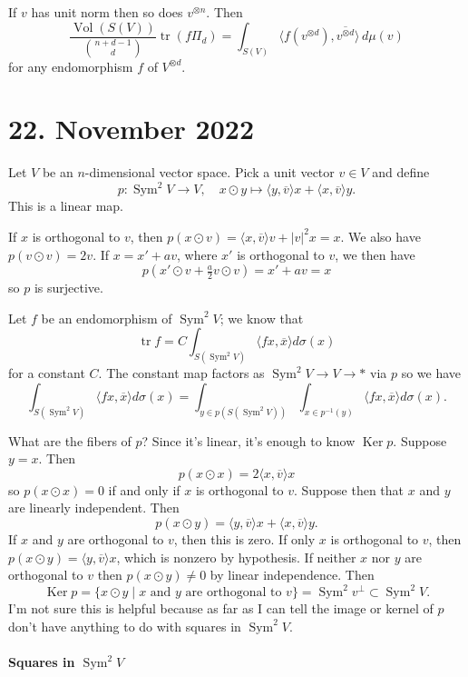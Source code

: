 \documentclass[11pt]{article}
\theoremstyle{definition}
\def\ov#1{\overline{#1}}
\DeclareMathOperator{\Vol}{Vol}
\DeclareMathOperator{\Ker}{Ker}
\DeclareMathOperator{\Sym}{Sym}
\DeclareMathOperator{\tr}{tr}
\begin{document}
If $v$ has unit norm then so does $v^{\otimes n}$.
Then
$$
\frac{\Vol(S(V))}{\binom{n+d-1}{d}} \tr(f \Pi_d)
= \int_{S(V)} \langle f(v^{\otimes d}), \ov{v^{\otimes d}} \rangle \, d\mu(v)
$$
for any endomorphism $f$ of $V^{\otimes d}$.


\section{22. November 2022}

Let $V$ be an $n$-dimensional vector space.
Pick a unit vector $v \in V$ and define
$$
p : \Sym^2 V \to V,
\quad
x \odot y \mapsto \langle y, \ov v \rangle x + \langle x, \ov v \rangle y.
$$
This is a linear map.

If $x$ is orthogonal to $v$, then
$p(x \odot v) = \langle x, \ov v \rangle v + |v|^2 x = x$.
We also have $p(v \odot v) = 2 v$.
If $x = x' + a v$, where $x'$ is orthogonal to $v$, we then have
$$
p(x' \odot v + \tfrac a2 v \odot v)
= x' + a v = x
$$
so $p$ is surjective.

Let $f$ be an endomorphism of $\Sym^2 V$; we know that
$$
\tr f = C \int_{S(\Sym^2 V)} \langle f x, \ov x \rangle d\sigma(x)
$$
for a constant $C$.
The constant map factors as $\Sym^2 V \to V \to *$ via $p$
so we have
$$
\int_{S(\Sym^2 V)} \langle f x, \ov x \rangle d\sigma(x)
= \int_{y \in p(S(\Sym^2 V))} \int_{x \in p^{-1}(y)}
\langle f x, \ov{x} \rangle d\sigma(x).
$$

What are the fibers of $p$?
Since it's linear, it's enough to know $\Ker p$.
Suppose $y = x$. Then
$$
p(x \odot x)
= 2 \langle x, \ov v \rangle x
$$
so $p(x \odot x) = 0$ if and only if $x$ is orthogonal to $v$.
Suppose then that $x$ and $y$ are linearly independent.
Then
$$
p(x \odot y) = \langle y, \ov v \rangle x + \langle x, \ov v \rangle y.
$$
If $x$ and $y$ are orthogonal to $v$, then this is zero.
If only $x$ is orthogonal to $v$, then $p(x \odot y) = \langle y, \ov v \rangle
x$, which is nonzero by hypothesis.
If neither $x$ nor $y$ are orthogonal to $v$ then $p(x \odot y) \not= 0$ by
linear independence.
Then
$$
\Ker p
= \{ x \odot y \mid \text{$x$ and $y$ are orthogonal to $v$} \}
= \Sym^2 v^\perp \subset \Sym^2 V.
$$
I'm not sure this is helpful because as far as I can tell the image or kernel
of $p$ don't have anything to do with squares in $\Sym^2 V$.


\paragraph{Squares in $\Sym^2 V$}
\end{document}
